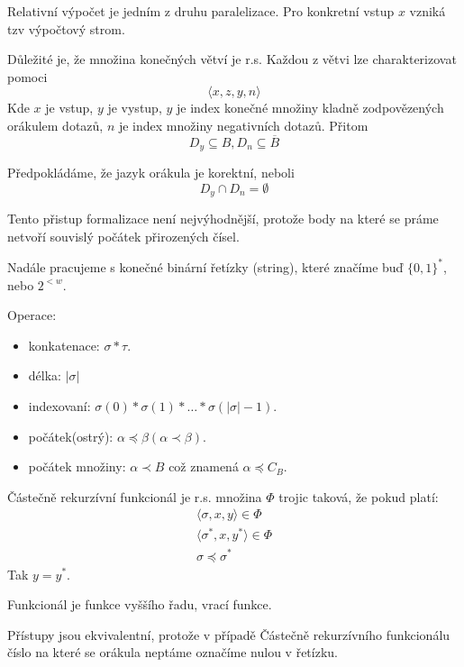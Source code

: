 \begin{note}
	Relativní výpočet je jedním z druhu paralelizace.
	Pro konkretní vstup $x$ vzniká tzv výpočtový strom.

	Důležité je, že množina konečných větví je r.s.
	Každou z větvi lze charakterizovat pomoci
	\[ \langle x, z, y, n \rangle \]
	Kde $x$ je vstup, $y$ je vystup, $y$ je index konečné množiny kladně zodpovězených orákulem dotazů, $n$ je index množiny negativních dotazů.
	Přitom
	\[ D_y \subseteq B, D_n \subseteq \overline{B} \]

	Předpokládáme, že jazyk orákula je korektní, neboli
	\[ D_y \cap D_n = \emptyset \]

	Tento přistup formalizace není nejvýhodnější, protože body na které se práme netvoří souvislý počátek přirozených čísel.
\end{note}

\begin{agreement}
	Nadále pracujeme s konečné binární řetízky (string), které značíme buď $\{ 0, 1 \}^{\ast}$, nebo $2^{<w}$.

	Operace:
	\begin{itemize}
		\item konkatenace: $\sigma * \tau$.
		\item délka: $|\sigma|$
		\item indexovaní: $\sigma(0) * \sigma(1) * \ldots * \sigma(|\sigma| - 1)$.
		\item počátek(ostrý): $\alpha \preccurlyeq \beta (\alpha \prec \beta)$.
		\item počátek množiny: $\alpha \prec B$ což znamená $\alpha \preccurlyeq C_B$.
	\end{itemize}
\end{agreement}

\begin{definition}
	Částečně rekurzívní funkcionál je r.s. množina $\Phi$ trojic taková, že pokud platí:
	\begin{gather*}
		\langle \sigma, x, y \rangle \in \Phi \\
		\langle \sigma^{\ast}, x, y^{\ast} \rangle \in \Phi \\
		\sigma \preccurlyeq \sigma^{\ast}
	\end{gather*}
	Tak $y = y^{\ast}$.

	Funkcionál je funkce vyššího řadu, vrací funkce.
\end{definition}

\begin{note}
	Přístupy jsou ekvivalentní, protože v případě Částečně rekurzívního funkcionálu číslo na které se orákula neptáme označíme nulou v řetízku.
\end{note}

